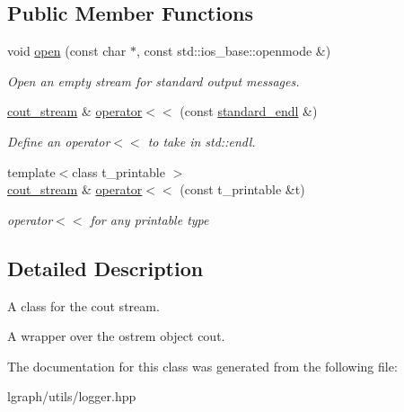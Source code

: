 \subsection*{Public Member Functions}
\begin{DoxyCompactItemize}
\item 
void \hyperlink{classlgraph_1_1utils_1_1cout__stream_a818a63700e577a13db63088353ce4098}{open} (const char $\ast$, const std\+::ios\+\_\+base\+::openmode \&)\hypertarget{classlgraph_1_1utils_1_1cout__stream_a818a63700e577a13db63088353ce4098}{}\label{classlgraph_1_1utils_1_1cout__stream_a818a63700e577a13db63088353ce4098}

\begin{DoxyCompactList}\small\item\em Open an empty stream for standard output messages. \end{DoxyCompactList}\item 
\hyperlink{classlgraph_1_1utils_1_1cout__stream}{cout\+\_\+stream} \& \hyperlink{classlgraph_1_1utils_1_1cout__stream_a6e35f97a622bccec72247d6f9e6ca2c8}{operator$<$$<$} (const \hyperlink{classlgraph_1_1utils_1_1cout__stream_a3dc3129e1e5c26c370223e29dbdefe75}{standard\+\_\+endl} \&)\hypertarget{classlgraph_1_1utils_1_1cout__stream_a6e35f97a622bccec72247d6f9e6ca2c8}{}\label{classlgraph_1_1utils_1_1cout__stream_a6e35f97a622bccec72247d6f9e6ca2c8}

\begin{DoxyCompactList}\small\item\em Define an operator$<$$<$ to take in std\+::endl. \end{DoxyCompactList}\item 
{\footnotesize template$<$class t\+\_\+printable $>$ }\\\hyperlink{classlgraph_1_1utils_1_1cout__stream}{cout\+\_\+stream} \& \hyperlink{classlgraph_1_1utils_1_1cout__stream_a88f6cf6d54312f795ccbff57724d51e4}{operator$<$$<$} (const t\+\_\+printable \&t)\hypertarget{classlgraph_1_1utils_1_1cout__stream_a88f6cf6d54312f795ccbff57724d51e4}{}\label{classlgraph_1_1utils_1_1cout__stream_a88f6cf6d54312f795ccbff57724d51e4}

\begin{DoxyCompactList}\small\item\em operator$<$$<$ for any printable type \end{DoxyCompactList}\end{DoxyCompactItemize}


\subsection{Detailed Description}
A class for the cout stream. 

A wrapper over the ostrem object cout. 

The documentation for this class was generated from the following file\+:\begin{DoxyCompactItemize}
\item 
lgraph/utils/logger.\+hpp\end{DoxyCompactItemize}
